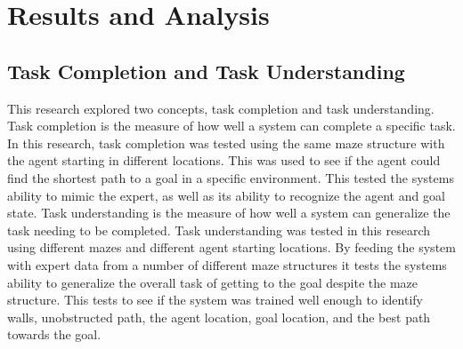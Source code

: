 \documentclass[12pt,american]{report}
\begin{document}
\chapter{Results and Analysis}
\label{sec:results_and_analysis}
\section{Task Completion and Task Understanding}
This research explored two concepts, task completion and task understanding. Task completion is the measure of how well a system can complete a specific task.  In this research, task completion was tested using the same maze structure with the agent starting in different locations.  This was used to see if the agent could find the shortest path to a goal in a specific environment.  This tested the systems ability to mimic the expert, as well as its ability to recognize the agent and goal state.  
Task understanding is the measure of how well a system can generalize the task needing to be completed. Task understanding was tested in this research using different mazes and different agent starting locations.  By feeding the system with expert data from a number of different maze structures it tests the systems ability to generalize the overall task of getting to the goal despite the maze structure.  This tests to see if the system was trained well enough to identify walls, unobstructed path, the agent location, goal location, and the best path towards the goal.
\end{document}
